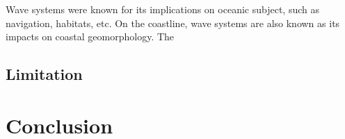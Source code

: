 Wave systems were known for its implications on oceanic subject, such as navigation,
habitats, etc. On the coastline, wave systems are also known as its impacts on coastal
geomorphology. The 

\subsection{Limitation}
\label{Limitation}

\section{Conclusion}
\label{c4_Conclusion}